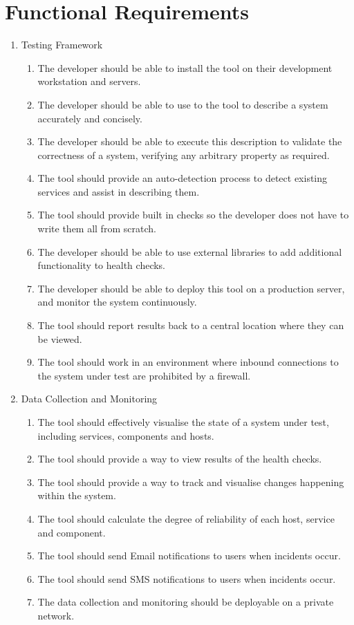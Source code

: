 \documentclass{cshonours}
\begin{document}
\section{Functional Requirements}
\begin{enumerate}
  \item Testing Framework
    \begin{enumerate}
      \item The developer should be able to install the tool on their development workstation and servers.
      \item The developer should be able to use to the tool to describe a system accurately and concisely.
      \item The developer should be able to execute this description to validate the correctness of a system, verifying any arbitrary property as required.
      \item The tool should provide an auto-detection process to detect existing services and assist in describing them.
      \item The tool should provide built in checks so the developer does not have to write them all from scratch.
      \item The developer should be able to use external libraries to add additional functionality to health checks.
      \item The developer should be able to deploy this tool on a production server, and monitor the system continuously.
      \item The tool should report results back to a central location where they can be viewed.
      \item The tool should work in an environment where inbound connections to the system under test are prohibited by a firewall.
    \end{enumerate}
  \item Data Collection and Monitoring
    \begin{enumerate}
      \item The tool should effectively visualise the state of a system under test, including services, components and hosts.
      \item The tool should provide a way to view results of the health checks.
      \item The tool should provide a way to track and visualise changes happening within the system.
      \item The tool should calculate the degree of reliability of each host, service and component.
      \item The tool should send Email notifications to users when incidents occur.
      \item The tool should send SMS notifications to users when incidents occur.
      \item The data collection and monitoring should be deployable on a private network.
    \end{enumerate}
\end{enumerate}
\end{document}
